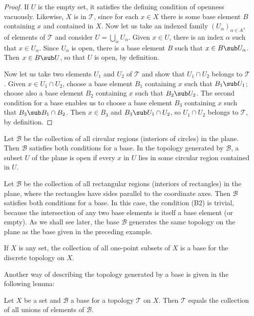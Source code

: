 \begin{proof}
If $U$ is the empty set, it satisfies the defining condition of openness vacuously. Likewise, $X$ is in $\mathcal{T}$, since for each $x\in X$ there is some base element $B$ containing $x$ and contained in $X$. Now let us take an indexed family $(U_\alpha)_{\alpha\in A}$, of elements of $\mathcal{T}$ and consider $U=\bigcup_{\alpha}U_\alpha$. Given $x\in U$, there is an index $\alpha$ such that $x\in U_\alpha$. Since $U_\alpha$ is open, there is a base element $B$ such that $x\in B\sub U_\alpha$. Then $x\in B\sub U$, so that $U$ is open, by definition.\par
Now let us take two elements $U_1$ and $U_2$ of $\mathcal{T}$ and show that $U_1\cap U_2$ belongs to $\mathcal{T}$. Given $x\in U_1\cap U_2$, choose a base element $B_1$ containing $x$ such that $B_1\sub U_1$; choose also a base element $B_2$ containing $x$ such that $B_2\sub U_2$. The second condition for a base enables us to choose a base element $B_3$ containing $x$ such that $B_3\sub B_1\cap B_2$. Then $x\in B_3$ and $B_3\sub U_1\cap U_2$, so $U_1\cap U_2$ belongs to $\mathcal{T}$, by definition.
\end{proof}
\begin{example}
Let $\mathcal{B}$ be the collection of all circular regions (interiors of circles) in the plane. Then $\mathcal{B}$ satisfies both conditions for a base. In the topology generated by $\mathcal{B}$, a subset $U$ of the plane is open if every $x$ in $U$ lies in some circular region contained in $U$.
\end{example}
\begin{example}
Let $\mathcal{B}$ be the collection of all rectangular regions (interiors of rectangles) in the plane, where the rectangles have sides parallel to the coordinate axes. Then $\mathcal{B}$ satisfies both conditions for a base. In this case, the condition (B2) is trivial, because the intersection of any two base elements is itself a base element (or empty). As we shall see later, the base $\mathcal{B}$ generates the same topology on the plane as the base given in the preceding example.
\end{example}
\begin{example}
If $X$ is any set, the collection of all one-point subsets of $X$ is a base for the discrete topology on $X$.
\end{example}
Another way of describing the topology generated by a base is given in the following lemma:
\begin{lemma}\label{topo space open set is union of base}
Let $X$ be a set and $\mathcal{B}$ a base for a topology $\mathcal{T}$ on $X$. Then $\mathcal{T}$ equals the collection of all unions of elements of $\mathcal{B}$.
\end{lemma}
